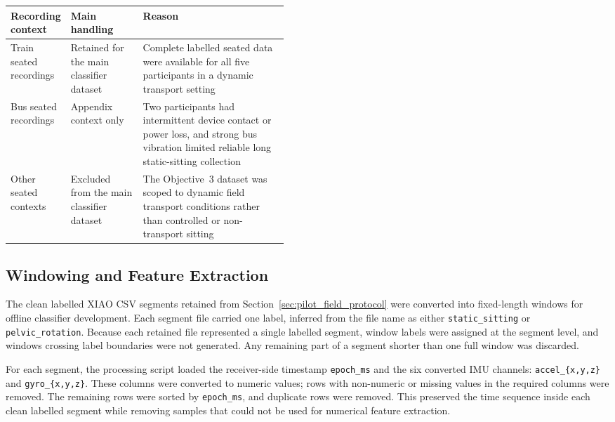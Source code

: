 \begin{center}
    \small
    \label{tab:objective3_data_use_boundary}
    \begin{tabularx}{\linewidth}{@{}p{0.20\linewidth}p{0.26\linewidth}X@{}}
        \toprule
        Recording context & Main handling & Reason \\
        \midrule
        Train seated recordings & Retained for the main classifier dataset & Complete labelled seated data were available for all five participants in a dynamic transport setting \\
        Bus seated recordings & Appendix context only & Two participants had intermittent device contact or power loss, and strong bus vibration limited reliable long static-sitting collection \\
        Other seated contexts & Excluded from the main classifier dataset & The Objective~3 dataset was scoped to dynamic field transport conditions rather than controlled or non-transport sitting \\
        \bottomrule
    \end{tabularx}
\end{center}

\subsection{Windowing and Feature Extraction}\label{sec:windowing_feature_extraction}

The clean labelled XIAO CSV segments retained from Section~\ref{sec:pilot_field_protocol} were converted into fixed-length windows for offline classifier development. Each segment file carried one label, inferred from the file name as either \texttt{static\_sitting} or \texttt{pelvic\_rotation}. Because each retained file represented a single labelled segment, window labels were assigned at the segment level, and windows crossing label boundaries were not generated. Any remaining part of a segment shorter than one full window was discarded.

For each segment, the processing script loaded the receiver-side timestamp \texttt{epoch\_ms} and the six converted IMU channels: \texttt{accel\_\{x,y,z\}} and \texttt{gyro\_\{x,y,z\}}. These columns were converted to numeric values; rows with non-numeric or missing values in the required columns were removed. The remaining rows were sorted by \texttt{epoch\_ms}, and duplicate rows were removed. This preserved the time sequence inside each clean labelled segment while removing samples that could not be used for numerical feature extraction.

